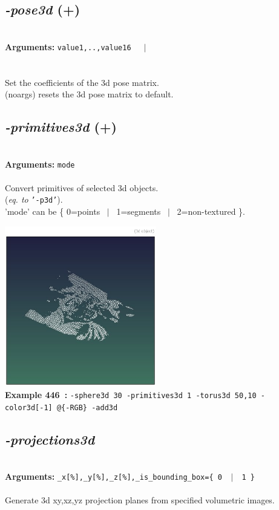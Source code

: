 \documentclass[a4paper,11pt,twoside]{book}
\begin{document}
\subsection{\emph{-pose3d} (+)}\vspace*{-0.5em}
~\\\textbf{Arguments: } 
{\small \texttt{value1,..,value16}}~~~$|$\\
\\~\\
Set the coefficients of the 3d pose matrix.
~\\(noargs) resets the 3d pose matrix to default.


\subsection{\emph{-primitives3d} (+)}\vspace*{-0.5em}
~\\\textbf{Arguments: } 
{\small \texttt{mode}}\\~\\
Convert primitives of selected 3d objects.
~\\(\emph{eq. to} {\small \texttt{'-p3d'}}).
~\\'mode' can be \{ 0=points ~$|$~ 1=segments ~$|$~ 2=non-textured \}.
\begin{center}\includegraphics[keepaspectratio=true,height=7cm,width=\textwidth]{img/gmic_def446.jpg}\\
{\footnotesize \textbf{Example 446~:} \texttt{-sphere3d 30 -primitives3d 1 -torus3d 50,10 -color3d[-1] @\{-RGB\} -add3d}}
\end{center}

\subsection{\emph{-projections3d} }\vspace*{-0.5em}
~\\\textbf{Arguments: } 
{\small \texttt{\_x[\%],\_y[\%],\_z[\%],\_is\_bounding\_box=\{ 0 ~$|$~ 1 \}}}\\~\\
Generate 3d xy,xz,yz projection planes from specified volumetric images.
\end{document}
